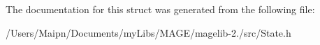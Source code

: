 The documentation for this struct was generated from the following file\-:\begin{DoxyCompactItemize}
\item 
/\-Users/\-Maipn/\-Documents/my\-Libs/\-M\-A\-G\-E/magelib-\/2./src/State.\-h\end{DoxyCompactItemize}
